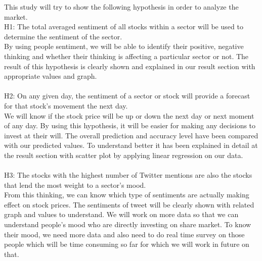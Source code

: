 This study will try to show the following hypothesis in order to analyze the market.\\
H1: The total averaged sentiment of all stocks within a sector will be used to determine the
sentiment of the sector.\\
By using people sentiment, we will be able to identify their positive, negative thinking and whether their thinking is affecting a particular sector or not. The result of this hypothesis is clearly shown and explained in our result section with appropriate values and graph.\\\\
H2: On any given day, the sentiment of a sector or stock will provide a forecast for that stock’s
movement the next day.\\
We will know if the stock price will be up or down the next day or next moment of any day. By using this hypothesis, it will be easier for making any decisions to invest at their will. The overall prediction and accuracy level have been compared with our predicted values. To understand better it has been explained in detail at the result section with scatter plot by applying linear regression on our data.\\\\
H3: The stocks with the highest number of Twitter mentions are also the stocks that lend the
most weight to a sector’s mood.\\
From this thinking, we can know which type of sentiments are actually making effect on stock prices. The sentiments of tweet will be clearly shown with related graph and values to understand. We will work on more data so that we can understand people’s mood who are directly investing on share market. To know their mood, we need more data and also need to do real time survey on those people which will be time consuming so far for which we will work in future on that.\\

